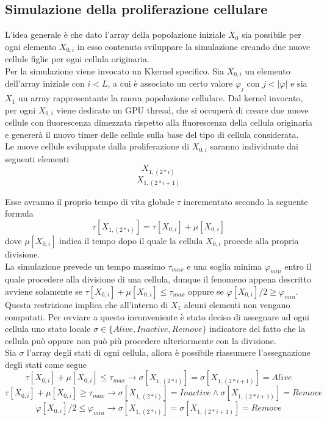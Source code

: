 \subsection{Simulazione della proliferazione cellulare}

L'idea generale è che dato l'array della popolazione iniziale $X_{0}$
sia possibile per ogni elemento $X_{0,i}$ in esso contenuto sviluppare
la simulazione creando due nuove cellule figlie per ogni cellula originaria.
\\
Per la simulazione viene invocato un Kkernel specifico.
Sia $X_{0,i}$ un elemento dell'array iniziale
con $i < L$, a cui è associato un certo valore $\varphi_{j}$
con $j < |\varphi|$ e sia $X_{1}$ un array rappresentante la nuova
popolazione cellulare.
Dal kernel invocato, per ogni $X_{0,i}$ viene dedicato un GPU thread,
che si occuperà di creare due nuove cellule con fluorescenza dimezzata
rispetto alla fluorescenza della cellula originaria e genererà
il nuovo timer delle cellule sulla base del tipo di cellula considerata.
\\
Le nuove cellule sviluppate dalla proliferazione
di $X_{0, i}$ saranno individuate dai seguenti elementi
$$X_{1, (2 * i)}$$ $$X_{1, (2 * i + 1)}$$

Esse avranno il proprio tempo di vita globale $\tau$
incrementato secondo la seguente formula
$$\tau[X_{1, (2 * i)}] = \tau[X_{0, i}] + \mu[X_{0, i}]$$
dove $\mu[X_{0, i}]$ indica il tempo dopo il quale la cellula $X_{0,i}$
procede alla propria divisione.
\\
La simulazione prevede un tempo massimo $\tau_{max}$ e una soglia minima
$\varphi_{min}$ entro il quale procedere
alla divisione di una cellula, dunque il fenomeno appena descritto avviene
solamente se $\tau[X_{0, i}] + \mu[X_{0, i}] \leqslant \tau_{max}$ oppure se
$\varphi[X_{0, i}] / 2 \geqslant \varphi_{min}$.
Questa restrizione implica che all'interno di $X_{1}$ alcuni elementi non
vengano computati. Per ovviare a questo inconveniente è stato deciso di
assegnare ad ogni cellula uno stato locale
$\sigma \in \{Alive, Inactive, Remove\}$ indicatore del fatto che la cellula
può oppure non può più procedere ulteriormente con la divisione.
\\
Sia $\sigma$ l'array degli stati di ogni cellula, allora è possibile riassumere
l'assegnazione degli stati come segue
$$\tau[X_{0, i}] + \mu[X_{0, i}] \leqslant \tau_{max}
\longrightarrow \sigma[X_{1, (2 * i)}] = \sigma[X_{1, (2 * i + 1)}] = Alive$$
$$\tau[X_{0, i}] + \mu[X_{0, i}] \geqslant \tau_{max}
\longrightarrow \sigma[X_{1, (2 * i)}] = Inactive \land
\sigma[X_{1, (2 * i + 1)}] = Remove$$
$$\varphi[X_{0, i}] / 2 \leqslant \varphi_{min}
\longrightarrow \sigma[X_{1, (2 * i)}] = \sigma[X_{1, (2 * i + 1)}] = Remove$$


